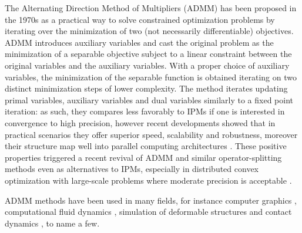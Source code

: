 \documentclass[final,3p]{elsarticle}
\begin{document}
The Alternating Direction Method of Multipliers (ADMM) has been proposed in the 1970s 
\cite{Glowinski75} %
\cite{Gabay1976} %
as a practical way to solve constrained optimization problems by iterating over the minimization of two (not necessarily differentiable) objectives.
ADMM introduces auxiliary variables and cast the original problem as the minimization of a separable objective subject to a linear constraint between the original variables and the auxiliary variables. With a proper choice of auxiliary variables, the minimization of the separable function is obtained iterating on two distinct minimization steps of lower complexity. The method iterates updating primal variables, auxiliary variables and dual variables similarly to a fixed point iteration: as such, they compares less favorably to IPMs if one is interested in convergence to high precision, however recent developments showed that in practical scenarios they offer superior speed, scalability and robustness, moreover their structure map well into parallel computing architectures
 \cite{Boyd2011}. %
These positive properties triggered a recent revival of ADMM and similar operator-splitting methods even as alternatives to IPMs, especially in distributed convex optimization with large-scale problems where moderate precision is acceptable
\cite{Cannon2019}. %

ADMM methods have been used in many fields, for instance computer graphics 
 \cite{Zhang2019}
, computational fluid dynamics
 \cite{Gregson2014} %
, simulation of deformable structures 
 \cite{Overby2017} %
and contact dynamics 
 \cite{Daviet2020} %
, to name a few.
\end{document}

